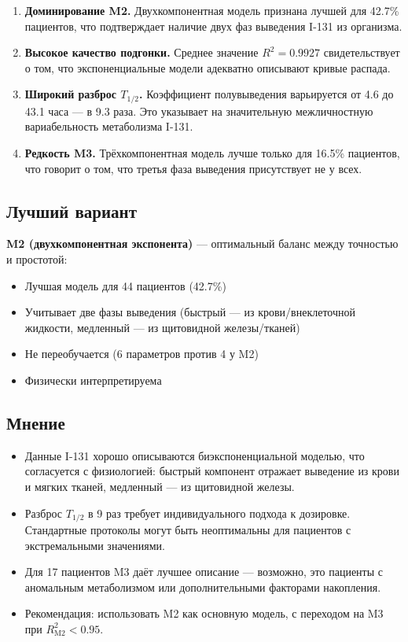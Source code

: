 \documentclass[12pt,a4paper]{article}
\begin{document}
\begin{enumerate}
    \item \textbf{Доминирование M2.} Двухкомпонентная модель признана лучшей для 42.7\% пациентов, 
    что подтверждает наличие двух фаз выведения I-131 из организма.
    
    \item \textbf{Высокое качество подгонки.} Среднее значение $R^2 = 0.9927$ свидетельствует 
    о том, что экспоненциальные модели адекватно описывают кривые распада.
    
    \item \textbf{Широкий разброс $T_{1/2}$.} Коэффициент полувыведения варьируется от 4.6 до 43.1 часа — 
    в 9.3 раза. Это указывает на значительную межличностную вариабельность метаболизма I-131.
    
    \item \textbf{Редкость M3.} Трёхкомпонентная модель лучше только для 16.5\% пациентов, 
    что говорит о том, что третья фаза выведения присутствует не у всех.
\end{enumerate}

\subsection*{Лучший вариант}

\textbf{M2 (двухкомпонентная экспонента)} — оптимальный баланс между точностью и простотой:
\begin{itemize}
    \item Лучшая модель для 44 пациентов (42.7\%)
    \item Учитывает две фазы выведения (быстрый — из крови/внеклеточной жидкости, 
    медленный — из щитовидной железы/тканей)
    \item Не переобучается (6 параметров против 4 у M2)
    \item Физически интерпретируема
\end{itemize}

\subsection*{Мнение}

\begin{itemize}
    \item Данные I-131 хорошо описываются биэкспоненциальной моделью, что согласуется 
    с физиологией: быстрый компонент отражает выведение из крови и мягких тканей, 
    медленный — из щитовидной железы.
    
    \item Разброс $T_{1/2}$ в 9 раз требует индивидуального подхода к дозировке. 
    Стандартные протоколы могут быть неоптимальны для пациентов с экстремальными значениями.
    
    \item Для 17 пациентов M3 даёт лучшее описание — возможно, это пациенты с 
    аномальным метаболизмом или дополнительными факторами накопления.
    
    \item Рекомендация: использовать M2 как основную модель, с переходом на M3 
    при $R^2_{\text{M2}} < 0.95$.
\end{itemize}
\end{document}

